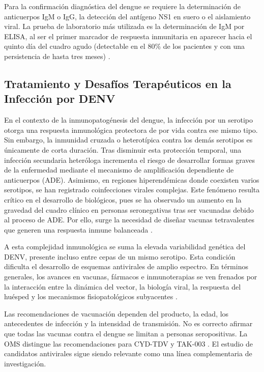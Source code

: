 Para la confirmación diagnóstica del dengue se requiere la determinación de anticuerpos IgM o IgG, la detección del antígeno NS1 en suero o el aislamiento viral. La prueba de laboratorio más utilizada es la determinación de IgM por ELISA, al ser el primer marcador de respuesta inmunitaria en aparecer hacia el quinto día del cuadro agudo (detectable en el 80\% de los pacientes y con una persistencia de hasta tres meses) \cite{fajardo2012dengue}. 

\subsection{Tratamiento y Desafíos Terapéuticos en la Infección por DENV}

En el contexto de la inmunopatogénesis del dengue, la infección por un serotipo otorga una respuesta inmunológica protectora de por vida contra ese mismo tipo. Sin embargo, la inmunidad cruzada o heterotípica contra los demás serotipos es únicamente de corta duración. Tras disminuir esta protección temporal, una infección secundaria heteróloga incrementa el riesgo de desarrollar formas graves de la enfermedad mediante el mecanismo de amplificación dependiente de anticuerpos (ADE). Asimismo, en regiones hiperendémicas donde coexisten varios serotipos, se han registrado coinfecciones virales complejas. Este fenómeno resulta crítico en el desarrollo de biológicos, pues se ha observado un aumento en la gravedad del cuadro clínico en personas seronegativas tras ser vacunadas debido al proceso de ADE. Por ello, surge la necesidad de diseñar vacunas tetravalentes que generen una respuesta inmune balanceada \cite{aynekulu2024role}.

A esta complejidad inmunológica se suma la elevada variabilidad genética del DENV, presente incluso entre cepas de un mismo serotipo. Esta condición dificulta el desarrollo de esquemas antivirales de amplio espectro. En términos generales, los avances en vacunas, fármacos e inmunoterapias se ven frenados por la interacción entre la dinámica del vector, la biología viral, la respuesta del huésped y los mecanismos fisiopatológicos subyacentes \cite{cavina2024orthoflaviviral}.

Las recomendaciones de vacunación dependen del producto, la edad, los antecedentes de infección y la intensidad de transmisión. No es correcto afirmar que todas las vacunas contra el dengue se limitan a personas seropositivas. La OMS distingue las recomendaciones para CYD-TDV y TAK-003 \cite{who2024denguevaccines}. El estudio de candidatos antivirales sigue siendo relevante como una línea complementaria de investigación.

